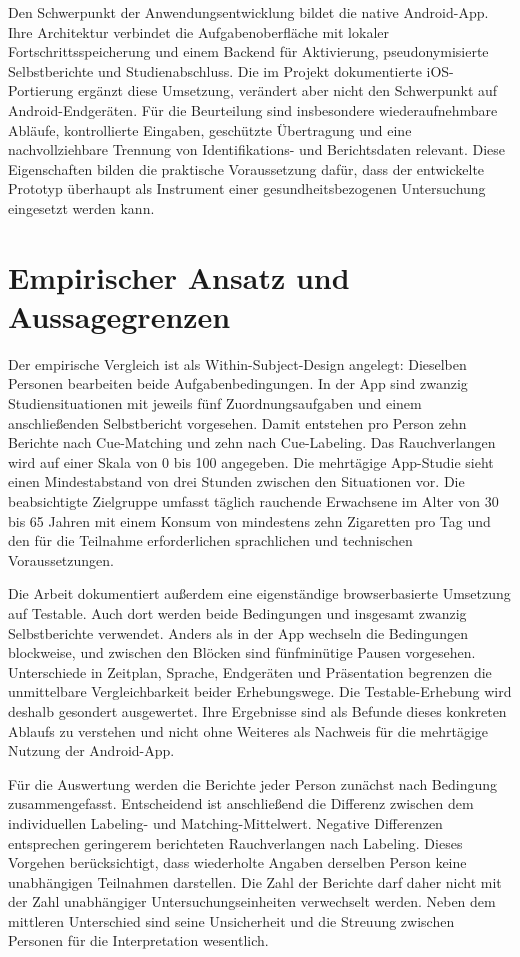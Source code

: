 Den Schwerpunkt der Anwendungsentwicklung bildet die native Android-App. Ihre Architektur verbindet die Aufgabenoberfläche mit lokaler Fortschrittsspeicherung und einem Backend für Aktivierung, pseudonymisierte Selbstberichte und Studienabschluss. Die im Projekt dokumentierte iOS-Portierung ergänzt diese Umsetzung, verändert aber nicht den Schwerpunkt auf Android-Endgeräten. Für die Beurteilung sind insbesondere wiederaufnehmbare Abläufe, kontrollierte Eingaben, geschützte Übertragung und eine nachvollziehbare Trennung von Identifikations- und Berichtsdaten relevant. Diese Eigenschaften bilden die praktische Voraussetzung dafür, dass der entwickelte Prototyp überhaupt als Instrument einer gesundheitsbezogenen Untersuchung eingesetzt werden kann.

\section*{Empirischer Ansatz und Aussagegrenzen}

Der empirische Vergleich ist als Within-Subject-Design angelegt: Dieselben Personen bearbeiten beide Aufgabenbedingungen. In der App sind zwanzig Studiensituationen mit jeweils fünf Zuordnungsaufgaben und einem anschließenden Selbstbericht vorgesehen. Damit entstehen pro Person zehn Berichte nach Cue-Matching und zehn nach Cue-Labeling. Das Rauchverlangen wird auf einer Skala von 0 bis 100 angegeben. Die mehrtägige App-Studie sieht einen Mindestabstand von drei Stunden zwischen den Situationen vor. Die beabsichtigte Zielgruppe umfasst täglich rauchende Erwachsene im Alter von 30 bis 65 Jahren mit einem Konsum von mindestens zehn Zigaretten pro Tag und den für die Teilnahme erforderlichen sprachlichen und technischen Voraussetzungen.

Die Arbeit dokumentiert außerdem eine eigenständige browserbasierte Umsetzung auf Testable. Auch dort werden beide Bedingungen und insgesamt zwanzig Selbstberichte verwendet. Anders als in der App wechseln die Bedingungen blockweise, und zwischen den Blöcken sind fünfminütige Pausen vorgesehen. Unterschiede in Zeitplan, Sprache, Endgeräten und Präsentation begrenzen die unmittelbare Vergleichbarkeit beider Erhebungswege. Die Testable-Erhebung wird deshalb gesondert ausgewertet. Ihre Ergebnisse sind als Befunde dieses konkreten Ablaufs zu verstehen und nicht ohne Weiteres als Nachweis für die mehrtägige Nutzung der Android-App.

Für die Auswertung werden die Berichte jeder Person zunächst nach Bedingung zusammengefasst. Entscheidend ist anschließend die Differenz zwischen dem individuellen Labeling- und Matching-Mittelwert. Negative Differenzen entsprechen geringerem berichteten Rauchverlangen nach Labeling. Dieses Vorgehen berücksichtigt, dass wiederholte Angaben derselben Person keine unabhängigen Teilnahmen darstellen. Die Zahl der Berichte darf daher nicht mit der Zahl unabhängiger Untersuchungseinheiten verwechselt werden. Neben dem mittleren Unterschied sind seine Unsicherheit und die Streuung zwischen Personen für die Interpretation wesentlich.

